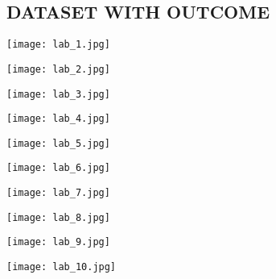 \documentclass[12pt,a4paper]{article}
\begin{document}
\begin{figure}
\subsection{DATASET WITH OUTCOME}
    \centering
    \texttt{[image: lab\_1.jpg]}
    \caption{ }
    \label{fig:2}
\end{figure}


\begin{figure}
    \centering
    \texttt{[image: lab\_2.jpg]}
    \caption{}
    \label{fig:enter-label}
\end{figure}

\begin{figure}
    \centering
    \texttt{[image: lab\_3.jpg]}
    \caption{}
    \label{fig:enter-label}
\end{figure}

\begin{figure}
    \centering
    \texttt{[image: lab\_4.jpg]}
    \caption{}
    \label{fig:enter-label}
\end{figure}

\begin{figure}
    \centering
    \texttt{[image: lab\_5.jpg]}
    \caption{}
    \label{fig:enter-label}
\end{figure}

\begin{figure}
    \centering
    \texttt{[image: lab\_6.jpg]}
    \caption{}
    \label{fig:enter-label}
\end{figure}

\begin{figure}
    \centering
    \texttt{[image: lab\_7.jpg]}
    \caption{}
    \label{fig:enter-label}
\end{figure}

\begin{figure}
    \centering
    \texttt{[image: lab\_8.jpg]}
    \caption{}
    \label{fig:enter-label}
\end{figure}

\begin{figure}
    \centering
    \texttt{[image: lab\_9.jpg]}
    \caption{}
    \label{fig:enter-label}
\end{figure}

\begin{figure}
    \centering
    \texttt{[image: lab\_10.jpg]}
    \caption{}
    \label{fig:enter-label}
\end{figure}
\end{document}
